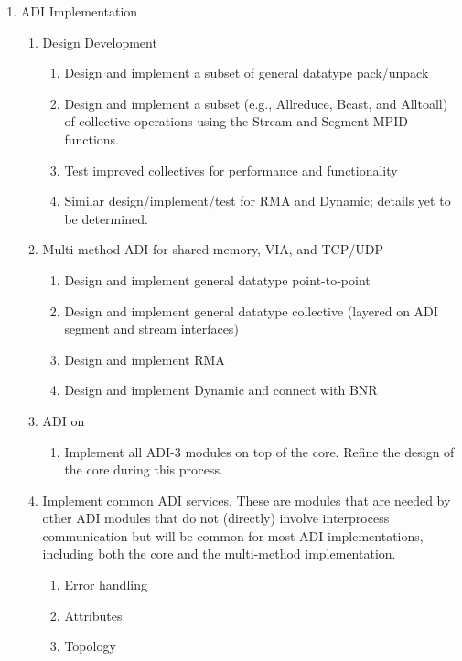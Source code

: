 \documentclass{article}
\begin{document}
\begin{enumerate}
\item ADI Implementation
    \begin{enumerate}
    \item Design Development
        \begin{enumerate}
        \item Design and implement a subset of general datatype pack/unpack
        \item Design and implement a subset (e.g., Allreduce, Bcast, and
          Alltoall) of collective operations using the Stream and Segment MPID
          functions.
        \item Test improved collectives for performance and functionality
        \item Similar design/implement/test for RMA and Dynamic; details yet
          to be determined.
        \end{enumerate}
    \item Multi-method ADI for shared memory, VIA, and TCP/UDP
        \begin{enumerate}
        \item Design and implement general datatype point-to-point
        \item Design and implement general datatype collective
        (layered on ADI segment and stream interfaces)
        \item Design and implement RMA
        \item Design and implement Dynamic and connect with BNR
        \end{enumerate}
    \item ADI on 
        \begin{enumerate}
        \item Implement all ADI-3 modules on top of the core.  Refine
        the design of the core during this process.   
        \end{enumerate}
    \item Implement common ADI services.  These are modules that are
    needed by other ADI modules that do not (directly) involve
    interprocess communication but will be common for most ADI
    implementations, including both the core and the multi-method
    implementation. 
        \begin{enumerate}
        \item Error handling
        \item Attributes
        \item Topology

\end{enumerate}
\end{enumerate}
\end{enumerate}
\end{document}

